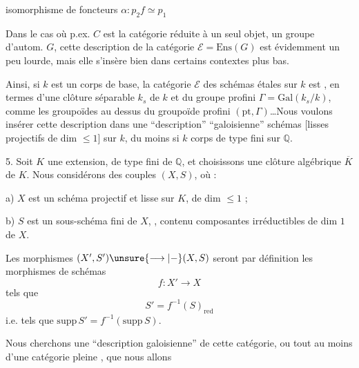 isomorphisme de foncteurs $\alpha:p_2f\simeq p_1$

Dans le cas où p.ex. $C$ est la catégorie réduite à un seul objet, un groupe d'autom. $G$, cette description de la catégorie $\mathcal E=\mathrm{Ens}(G)$ est évidemment un peu lourde, mais elle s'insère bien dans certains contextes plus bas.

Ainsi, si $k$ est un corps de base, la catégorie $\mathcal E$ des schémas étales sur $k$ est , en termes d'une clôture séparable $k_s$ de $k$ et du groupe profini $\Gamma=\mathrm{Gal}(k_s/k)$, comme les groupoïdes  au dessus du groupoïde profini $(\mathrm{pt},\Gamma)$\dots Nous voulons insérer cette description dans une ``description'' ``galoisienne''  \inserted{[certains]} schémas [lisses  projectifs de dim $\leq 1$] sur $k$, du moins si $k$ corps de type fini sur $\mathbb Q$.



5. Soit $K$ une extension, de type fini de $\mathbb Q$, et choisissons une clôture algébrique $\overline K$ de $K$.
 Nous considérons des couples $(X,S)$, où : 

a) $X$ est un schéma projectif et lisse sur $K$, de dim $\leq 1$ ;

b) $S$ est un sous-schéma fini  de $X$, , contenu     composantes irréductibles de dim $1$ de $X$.

Les morphismes $(X',S')\unsure{\longrightarrow|-}(X,S)$ seront par définition les morphismes de schémas
\[
f:X'\longrightarrow X
\]
tels que
\[
S'=f^{-1}(S)_{\mathrm{red}}
\]
i.e. tels que $\mathrm{supp}\,S'=f^{-1}(\mathrm{supp}\,S)$.

Nous cherchons une ``description galoisienne'' de cette catégorie, ou tout au moins d'une catégorie pleine , que nous allons

